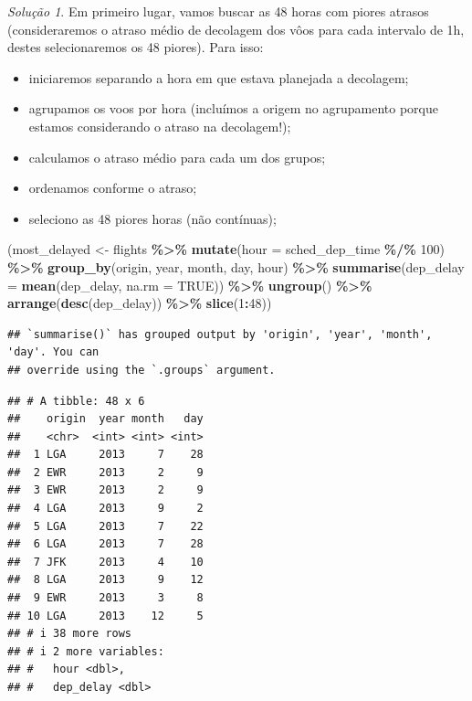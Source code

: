 \documentclass[
]{latex/krantz}
\newenvironment{Shaded}{\begin{snugshade}}{\end{snugshade}}
\newcommand{\AttributeTok}[1]{\textcolor[rgb]{0.13,0.29,0.53}{#1}}
\newcommand{\ConstantTok}[1]{\textcolor[rgb]{0.56,0.35,0.01}{#1}}
\newcommand{\DecValTok}[1]{\textcolor[rgb]{0.00,0.00,0.81}{#1}}
\newcommand{\FunctionTok}[1]{\textcolor[rgb]{0.13,0.29,0.53}{\textbf{#1}}}
\newcommand{\NormalTok}[1]{#1}
\newcommand{\OtherTok}[1]{\textcolor[rgb]{0.56,0.35,0.01}{#1}}
\newcommand{\SpecialCharTok}[1]{\textcolor[rgb]{0.81,0.36,0.00}{\textbf{#1}}}
\providecommand{\tightlist}{%
  \setlength{\itemsep}{0pt}\setlength{\parskip}{0pt}}
\theoremstyle{definition}
\theoremstyle{definition}
\theoremstyle{definition}
\theoremstyle{definition}
\theoremstyle{remark}
\newtheorem*{solution}{Solução}
\begin{document}
\begin{solution}
Em primeiro lugar, vamos buscar as 48 horas com piores atrasos (consideraremos o atraso médio de decolagem dos vôos para cada intervalo de 1h, destes selecionaremos os 48 piores). Para isso:

\begin{itemize}
\tightlist
\item
  iniciaremos separando a hora em que estava planejada a decolagem;
\item
  agrupamos os voos por hora (incluímos a origem no agrupamento porque estamos considerando o atraso na decolagem!);
\item
  calculamos o atraso médio para cada um dos grupos;
\item
  ordenamos conforme o atraso;
\item
  seleciono as 48 piores horas (não contínuas);
\end{itemize}

\begin{Shaded}
\begin{Highlighting}[]
\NormalTok{(most\_delayed }\OtherTok{\textless{}{-}}\NormalTok{ flights }\SpecialCharTok{\%\textgreater{}\%}
  \FunctionTok{mutate}\NormalTok{(}\AttributeTok{hour =}\NormalTok{ sched\_dep\_time }\SpecialCharTok{\%/\%} \DecValTok{100}\NormalTok{) }\SpecialCharTok{\%\textgreater{}\%}
  \FunctionTok{group\_by}\NormalTok{(origin, year, month, day, hour) }\SpecialCharTok{\%\textgreater{}\%}
  \FunctionTok{summarise}\NormalTok{(}\AttributeTok{dep\_delay =} \FunctionTok{mean}\NormalTok{(dep\_delay, }\AttributeTok{na.rm =} \ConstantTok{TRUE}\NormalTok{)) }\SpecialCharTok{\%\textgreater{}\%}
  \FunctionTok{ungroup}\NormalTok{() }\SpecialCharTok{\%\textgreater{}\%}
  \FunctionTok{arrange}\NormalTok{(}\FunctionTok{desc}\NormalTok{(dep\_delay)) }\SpecialCharTok{\%\textgreater{}\%}
  \FunctionTok{slice}\NormalTok{(}\DecValTok{1}\SpecialCharTok{:}\DecValTok{48}\NormalTok{))}
\end{Highlighting}
\end{Shaded}

\begin{verbatim}
## `summarise()` has grouped output by 'origin', 'year', 'month', 'day'. You can
## override using the `.groups` argument.
\end{verbatim}

\begin{verbatim}
## # A tibble: 48 x 6
##    origin  year month   day
##    <chr>  <int> <int> <int>
##  1 LGA     2013     7    28
##  2 EWR     2013     2     9
##  3 EWR     2013     2     9
##  4 LGA     2013     9     2
##  5 LGA     2013     7    22
##  6 LGA     2013     7    28
##  7 JFK     2013     4    10
##  8 LGA     2013     9    12
##  9 EWR     2013     3     8
## 10 LGA     2013    12     5
## # i 38 more rows
## # i 2 more variables:
## #   hour <dbl>,
## #   dep_delay <dbl>
\end{verbatim}


\end{solution}
\end{document}
